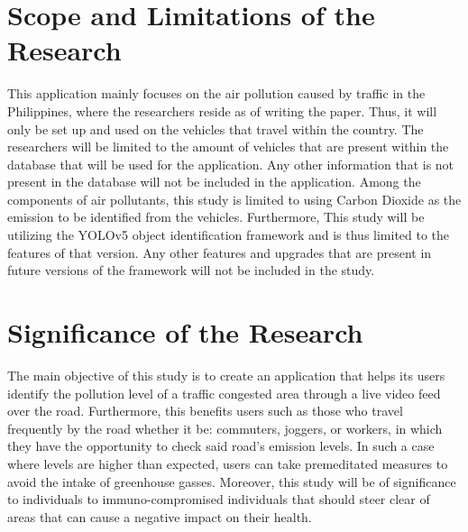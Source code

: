 \section{Scope and Limitations of the Research}
\label{sec:scopelimitations}
This application mainly focuses on the air pollution caused by traffic in the Philippines, where the researchers reside as of writing the paper. Thus, it will only be set up and used on the vehicles that travel within the country. The researchers will be limited to the amount of vehicles that are present within the database that will be used for the application. Any other information that is not present in the database will not be included in the application. Among the components of air pollutants, this study is limited to using Carbon Dioxide as the emission to be identified from the vehicles. Furthermore, This study will be utilizing the YOLOv5 object identification framework  and is thus limited to the features of that version. Any other features and upgrades that are present in future versions of the framework will not be included in the study.


\begin{comment}

%
%
Generally, one paragraph should be allotted for each of your research objectives.

Each paragraph contains a brief overview of the concept/theory and the purpose of doing the associated objective.

Each paragraph also includes a description of the scope/limitation of your study.

* Please refer to the slides for examples.

\end{comment}


\section{Significance of the Research}
\label{sec:significance}

The main objective of this study is to create an application that helps its users identify the pollution level of a traffic congested area through a live video feed over the road. Furthermore, this benefits users such as those who travel frequently by the road whether it be: commuters, joggers, or workers, in which they have the opportunity to check said road’s emission levels. In such a case where levels are higher than expected, users can take premeditated measures to avoid the intake of greenhouse gasses. Moreover, this study will be of significance to individuals to immuno-compromised individuals that should steer clear of areas that can cause a negative impact on their health. 

